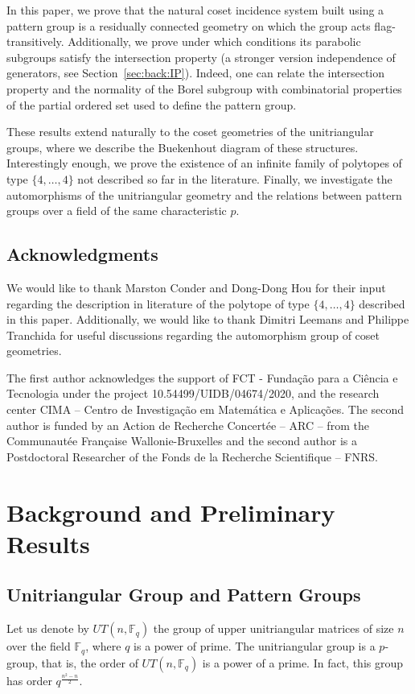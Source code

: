 \documentclass[11pt,letterpaper]{amsart}
\newcommand{\FF}{\mathbb{F}}
\begin{document}
In this paper, we prove that the natural coset incidence system built using a pattern group is a residually connected geometry on which the group acts flag-transitively. Additionally, we prove under which conditions its parabolic subgroups satisfy the intersection property (a stronger version independence of generators, see Section~\ref{sec:back:IP}). 
 Indeed, one can relate the intersection property and the normality of the Borel subgroup with combinatorial properties of the partial ordered set used to define the pattern group.

These results extend naturally to the coset geometries of the unitriangular groups, where we describe the Buekenhout diagram of these structures. Interestingly enough, we prove the existence of an infinite family of polytopes of type $\{4,\ldots,4\}$ not described so far in the literature.
Finally, we investigate the automorphisms of the unitriangular geometry and the relations between pattern groups over a field of the same characteristic $p$.


\subsection{Acknowledgments}
We would like to thank Marston Conder and Dong-Dong Hou for their input regarding the description in literature of the polytope of type $\{4,\ldots,4\}$ described in this paper.
Additionally, we would like to thank Dimitri Leemans and Philippe Tranchida for useful discussions regarding the automorphism group of coset geometries.

The first author acknowledges the support of FCT - Funda\c{c}\~ao para a Ci\^{e}ncia e Tecnologia under the project 10.54499/UIDB/04674/2020, and the research center CIMA -- Centro de Investigação em Matemática e Aplicações.
The second author is funded by an Action de Recherche Concert\'{e}e -- ARC -- from the Communaut\'{e}e Fran\c{c}aise Wallonie-Bruxelles and the second author is a Postdoctoral Researcher of the Fonds de la Recherche Scientifique -- FNRS. 


\section{Background and Preliminary Results}
\subsection{Unitriangular Group and Pattern Groups}\label{sec:UTG_PG}
Let us denote by $UT(n,\FF_q)$ the group of upper unitriangular matrices of size $n$ over the field $\mathbb{F}_q$, where $q$ is a power of prime.
The unitriangular group is a $p$-group, that is, the order of $UT(n,\FF_q)$ is a power of a prime. In fact, this group has order $q^{\frac{n^2-n}{2}}$. 
\end{document}

